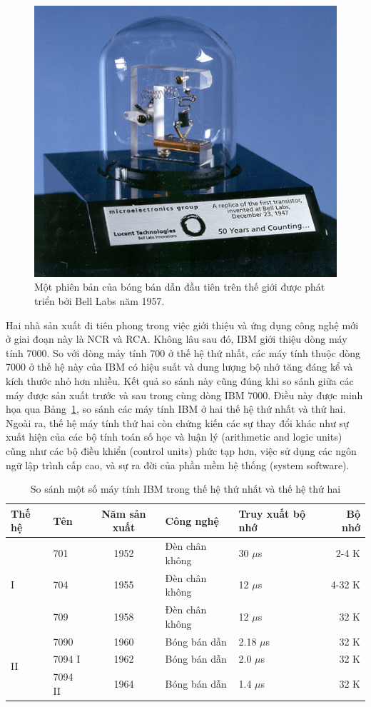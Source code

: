 \begin{figure}[h]
	\centering
		\includegraphics[width=0.7\columnwidth]{chapter01/figure/transistor.jpg}
		\centering
	\caption{Một phiên bản của bóng bán dẫn đầu tiên trên thế giới được phát triển bởi Bell Labs năm 1957.}
	\label{fig:transistor}
\end{figure}

Hai nhà sản xuất đi tiên phong trong việc giới thiệu và ứng dụng công nghệ mới ở giai đoạn này là NCR và RCA. Không lâu sau đó, IBM giới thiệu dòng máy tính 7000. So với dòng máy tính 700 ở thế hệ thứ nhất, các máy tính thuộc dòng 7000 ở thế hệ này của IBM có hiệu suất và dung lượng bộ nhớ tăng đáng kể và kích thước nhỏ hơn nhiều. Kết quả so sánh này cũng đúng khi so sánh giữa các máy được sản xuất trước và sau trong cùng dòng IBM 7000. Điều này được minh họa qua Bảng~\ref{tab:IBM700}, so sánh các máy tính IBM ở hai thế hệ thứ nhất và thứ hai. Ngoài ra, thế hệ máy tính thứ hai còn chứng kiến các sự thay đổi khác như sự xuất hiện của các bộ tính toán số học và luận lý (arithmetic and logic units) cũng như các bộ điều khiển (control units) phức tạp hơn, việc sử dụng các ngôn ngữ lập trình cấp cao, và sự ra đời của phần mềm hệ thống (system software).

\begin{table}[h]
	\small
	\caption{So sánh một số máy tính IBM trong thế hệ thứ nhất và thế hệ thứ hai}
	\label{tab:IBM700}
		\begin{tabular}{l||l|c|l|p{1.7cm}|r}
			\hline
			\textbf{Thế hệ} & \textbf{Tên} & \textbf{Năm sản xuất} & \textbf{Công nghệ} &\textbf{Truy xuất bộ nhớ} & \textbf{Bộ nhớ}\\
			\hline
			\hline
			\multirow{3}{*}{I} & 701 &  1952 & Đèn chân không & 30 $\mu$s& 2-4 K\\
			\cline{2-6}
			& 704 & 1955 & Đèn chân không & 12 $\mu$s & 4-32 K\\
			\cline{2-6}
			& 709 & 1958 & Đèn chân không & 12 $\mu$s & 32 K \\
			\hline
			\hline
			\multirow{3}{*}{II} & 7090 & 1960 & Bóng bán dẫn & 2.18 $\mu$s& 32 K\\
			\cline{2-6}
			& 7094 I & 1962 & Bóng bán dẫn & 2.0 $\mu$s& 32 K\\
			\cline{2-6}
			& 7094 II & 1964 & Bóng bán dẫn & 1.4 $\mu$s& 32 K\\
			\hline
		\end{tabular}
\end{table}

